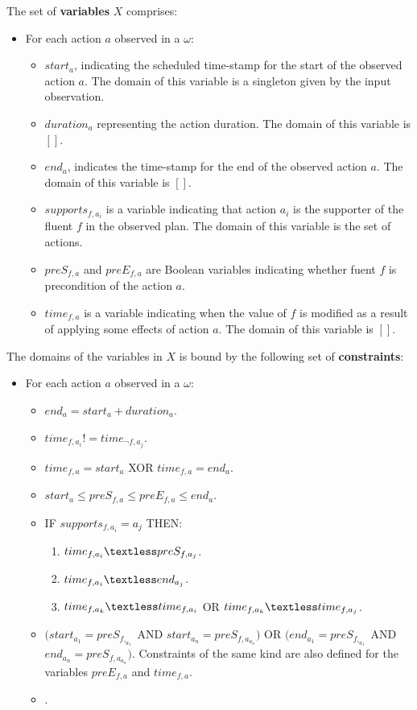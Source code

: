 \documentclass[letterpaper]{article} %
\begin{document}
The set of {\bf variables} $X$ comprises:
\begin{itemize}
\item For each action $a$ observed in a $\omega$:
\begin{itemize}
\item $start_a$, indicating the scheduled time-stamp for the start of the observed action $a$. The domain of this variable is a singleton given by the input observation.
\item $duration_a$ representing the action duration. The domain of this variable is $[]$.
\item $end_a$, indicates the time-stamp for the end of the observed action $a$. The domain of this variable is $[]$.
\item $supports_{f,a_i}$ is a variable indicating that action $a_i$ is the supporter of the fluent $f$ in the observed plan. The domain of this variable is the set of actions.
\item $preS_{f,a}$ and $preE_{f,a}$ are Boolean variables indicating whether fuent $f$ is precondition of the action $a$.
\item $time_{f,a}$ is a variable indicating when the value of $f$ is modified as a result of applying some effects of action $a$. The domain of this variable is $[]$.
\end{itemize}
\end{itemize}

The domains of the variables in $X$ is bound by the following set of {\bf constraints}:
\begin{itemize}
\item For each action $a$ observed in a $\omega$:
\begin{itemize}
\item $end_a = start_a + duration_a$.
\item $time_{f,a_i}!=time_{\neg f,a_j}$.
\item $time_{f,a}= start_a$ XOR $time_{f,a}= end_a$.
\item $start_a\leq preS_{f,a}\leq preE_{f,a}\leq end_a$.
\item IF $supports_{f,a_i}=a_j$ THEN:
\begin{enumerate}
\item $time_{f,a_i}\textless  preS_{f,a_j}$.
\item $time_{f,a_i}\textless  end_{a_j}$.
\item $time_{f,a_k}\textless time_{f,a_i}$ OR $time_{f,a_k}\textless time_{f,a_j}$.
\end{enumerate}
\item $(start_{a_1} = preS_{f,_{a_1}}$ AND $start_{a_n} = preS_{f,a_{a_n}})$ OR $(end_{a_1} = preS_{f,_{a_1}}$ AND $end_{a_n} = preS_{f,a_{a_n}})$. Constraints of the same kind are also defined for the variables $preE_{f,a}$ and $time_{f,a}$.
\item .
\end{itemize}
\end{itemize}
\end{document}

